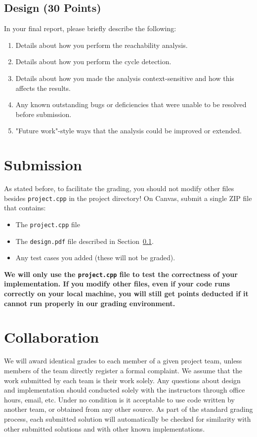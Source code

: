 \documentclass[12pt]{article}
\newcommand{\codeIn}[1]{{\small\tt{#1}}}
\newcommand{\implementationFile}{\codeIn{project.cpp} }
\begin{document}
\subsection{Design (30 Points)}\label{sec:design}

In your final report, 
please briefly describe the following:
%
\begin{enumerate}
\item Details about how you perform the reachability analysis.
\item Details about how you perform the cycle detection.
\item Details about how you made the analysis context-sensitive and how this affects the results.
\item Any known outstanding bugs or deficiencies that were unable to be resolved before submission.
\item "Future work"-style ways that the analysis could be improved or extended.
 \end{enumerate}

\section{Submission}\label{sec:sub}
As stated before, to facilitate the grading, you should not modify other files besides \codeIn{project.cpp} in the project directory!
On Canvas, submit a single ZIP file that contains:
\begin{itemize}
    \item The \implementationFile file
    \item The \codeIn{design.pdf} file described in Section~\ref{sec:design}.
    \item Any test cases you added (these will not be graded).
\end{itemize}
\textbf{We will only use the \implementationFile file to test the correctness of your implementation. If you modify other files, even if your code runs correctly on your local machine, you will still get points deducted if it cannot run properly in our grading environment.}

\section{Collaboration}
%
We will award identical grades to each member of a given project team, unless members of the team directly register a formal complaint.
%
We assume that the work submitted by each team is their work solely.
% 
Any questions about design and implementation should conducted solely with the instructors through office hours, email, etc.
%
Under no condition is it acceptable to use code written by another team, or obtained from any other source.
%
As part of the standard grading process, each submitted solution will automatically be checked for similarity with other submitted solutions and with other known implementations.
\end{document}
